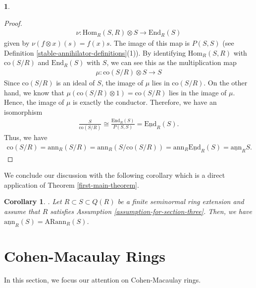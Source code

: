 \documentclass[12pt]{amsart}
\newcommand{\Hom}{\mathrm{Hom}}
\newcommand{\End}{\mathrm{End}}
\newcommand{\sEnd}{\underline{\mathrm{End}}}
\newcommand{\ann}{\mathrm{ann}}
\newcommand{\sann}{\underline{\mathrm{ann}}}
\newcommand{\arann}{\mathrm{ARann}}
\newcommand\co{\mathrm{co}}
\newtheorem{corollary}[theorem]{Corollary}
\theoremstyle{definition}
\newtheorem{chunk}[theorem]{}
\numberwithin{equation}{theorem}
\begin{document}
\begin{chunk}
\begin{proof}
\begin{align*}
            \nu \colon \Hom_R(S,R) \otimes S \to \End_R(S)
        \end{align*} 
        given by $\nu(f \otimes x)(s) = f(x)s $. The image of this map is $P(S,S)$ (see Definition \ref{stable-annihilator-definitions}(1)). By identifying $\Hom_R(S,R)$ with $\co(S/R)$ and $\End_R(S)$ with $S$, we can see this as the multiplication map
        \begin{align*}
            \mu \colon \co(S/R) \otimes S \to S
        \end{align*}
        Since $\co(S/R)$ is an ideal of $S$, the image of $\mu$ lies in $\co(S/R)$. On the other hand, we know that $\mu(\co(S/R) \otimes 1) = \co(S/R)$ lies in the image of $\mu$. Hence, the image of $\mu$ is exactly the conductor. Therefore, we have an isomorphism
        \begin{align*}
            \frac{S}{\co(S/R)} \cong \frac{\End_R(S)}{P(S,S)} = \sEnd_R(S).
        \end{align*}
        Thus, we have
        \begin{align*}
            \co(S/R) = \ann_R (S/R) = \ann_R(S / \co(S/R)) = \ann_R \sEnd_R(S) = \sann_R S.
        \end{align*}
    \end{proof}
    We conclude our discussion with the following corollary which is a direct application of Theorem \ref{first-main-theorem}.
    \begin{corollary}.
        Let $R \subset S \subset Q(R)$ be a finite seminormal ring extension and assume that $R$ satisfies Assumption \ref{assumption-for-section-three}. Then, we have $\sann_R(S) = \arann_R(S)$.
    \end{corollary}
\end{chunk}


\fi


\section{Cohen-Macaulay Rings}

In this section, we focus our attention on Cohen-Macaulay rings. 
\end{document}
